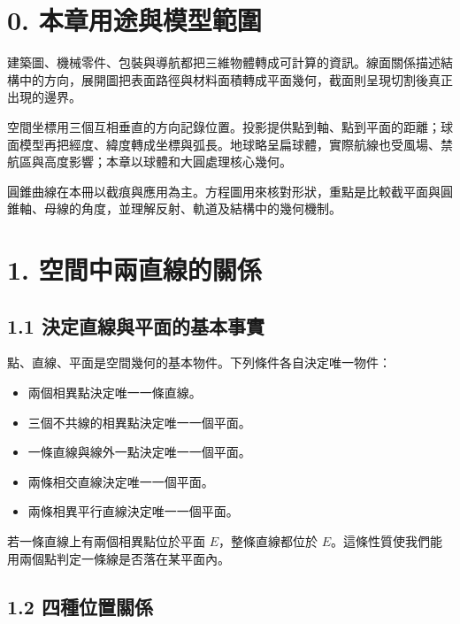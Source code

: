 \documentclass[11pt,a4paper]{article}
\providecommand{\tightlist}{%
  \setlength{\itemsep}{0pt}\setlength{\parskip}{0pt}}
\begin{document}
\section{0. 本章用途與模型範圍}\label{ux672cux7ae0ux7528ux9014ux8207ux6a21ux578bux7bc4ux570d}

建築圖、機械零件、包裝與導航都把三維物體轉成可計算的資訊。線面關係描述結構中的方向，展開圖把表面路徑與材料面積轉成平面幾何，截面則呈現切割後真正出現的邊界。

空間坐標用三個互相垂直的方向記錄位置。投影提供點到軸、點到平面的距離；球面模型再把經度、緯度轉成坐標與弧長。地球略呈扁球體，實際航線也受風場、禁航區與高度影響；本章以球體和大圓處理核心幾何。

圓錐曲線在本冊以截痕與應用為主。方程圖用來核對形狀，重點是比較截平面與圓錐軸、母線的角度，並理解反射、軌道及結構中的幾何機制。

\section{1. 空間中兩直線的關係}\label{ux7a7aux9593ux4e2dux5169ux76f4ux7ddaux7684ux95dcux4fc2}

\subsection{1.1 決定直線與平面的基本事實}\label{ux6c7aux5b9aux76f4ux7ddaux8207ux5e73ux9762ux7684ux57faux672cux4e8bux5be6}

點、直線、平面是空間幾何的基本物件。下列條件各自決定唯一物件：

\begin{itemize}
\tightlist
\item
  兩個相異點決定唯一一條直線。
\item
  三個不共線的相異點決定唯一一個平面。
\item
  一條直線與線外一點決定唯一一個平面。
\item
  兩條相交直線決定唯一一個平面。
\item
  兩條相異平行直線決定唯一一個平面。
\end{itemize}

若一條直線上有兩個相異點位於平面 \(E\)，整條直線都位於 \(E\)。這條性質使我們能用兩個點判定一條線是否落在某平面內。

\subsection{1.2 四種位置關係}\label{ux56dbux7a2eux4f4dux7f6eux95dcux4fc2}
\end{document}
